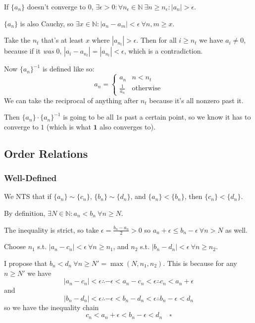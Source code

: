\documentclass[12pt]{article}
\newcommand{\N}{\mathbb{N}}
\begin{document}
If $\{a_n\}$ doesn't converge to $0$,
$\exists \epsilon > 0: \forall n_\epsilon \in \N\ \exists n \ge n_\epsilon: |a_n| > \epsilon$.

$\{a_n\}$ is also Cauchy, so $\exists x \in \N: |a_n-a_m| < \epsilon\ \forall n, m \ge x$.

Take the $n_t$ that's at least $x$ where $|a_{n_t}| > \epsilon$.
Then for all $i \ge n_t$ we have $a_i \ne 0$,
because if it \textit{was} $0$, $|a_i-a_{n_t}| = |a_{n_t}| < \epsilon$, which is a contradiction.

Now $\{a_n\}^{-1}$ is defined like so:
\[a_n = \begin{cases}
    a_n           & n < n_t          \\
    \frac{1}{a_n} & \text{otherwise}
  \end{cases}\]
We can take the reciprocal of anything after $n_t$ because it's all nonzero past it.

Then $\{a_n\} \cdot \{a_n\}^{-1}$ is going to be all $1$s past a certain point,
so we know it has to converge to $1$ (which is what $\mathbf{1}$ also converges to).

\pagebreak

\subsection{Order Relations}

\subsubsection{Well-Defined}

We NTS that if $\{a_n\} \sim \{c_n\}$, $\{b_n\} \sim \{d_n\}$,
and $\{a_n\} < \{b_n\}$, then $\{c_n\} < \{d_n\}$.

By definition, $\exists N \in \N: a_n < b_n\ \forall n \ge N$.

The inequality is strict, so take $\epsilon=\frac{b_n-a_n}{2}>0$ so $a_n + \epsilon \le b_n - \epsilon\ \forall n > N$ as well.

Choose $n_1$ s.t. $|a_n-c_n| < \epsilon\ \forall n \ge n_1$,
and $n_2$ s.t. $|b_n-d_n| < \epsilon\ \forall n \ge n_2$.

I propose that $b_n < d_n\ \forall n \ge N' = \max(N, n_1, n_2)$.
This is because for any $n \ge N'$ we have
\[|a_n-c_n| < \epsilon \therefore -\epsilon < a_n-c_n < \epsilon \therefore c_n < a_n +\epsilon\]
and
\[|b_n-d_n| < \epsilon \therefore -\epsilon < b_n-d_n < \epsilon \therefore b_n - \epsilon < d_n\]
so we have the inequality chain
\[c_n < a_n + \epsilon < b_n - \epsilon < d_n\quad\square\]
\end{document}

